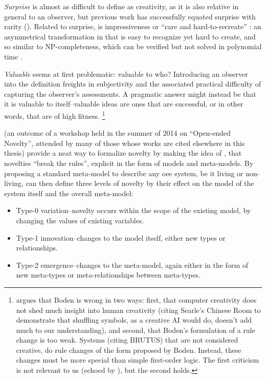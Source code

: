 \begin{mdframed}[style=box, frametitle={Creativity, and its relationship to Novelty, Surprise, and Value}]
\emph{Surprise} is almost as difficult to define as creativity, as it is also relative in general to an observer, but previous work has successfully equated surprise with rarity (\eg \cite{Kowaliw2009}). Related to surprise, is impressiveness or ``rare and hard-to-recreate'' \parencite{Lehman2012}: an asymmetrical transformation in that is easy to recognize yet hard to create, and so similar to NP-completeness, which can be verified but not solved in polynomial time \parencite{Lehman2012}.

\emph{Valuable} seems at first problematic: valuable to who? Introducing an observer into the definition freights in subjectivity and the associated practical difficulty of capturing the observer's assessments. A pragmatic answer might instead be that it is valuable to itself--valuable ideas are ones that are successful, or in other words, that are of high fitness. 
\footnote{\cite{Bringsjord2000} argues that Boden is wrong in two ways: first, that computer creativity does not shed much insight into human creativity (citing Searle's Chinese Room to demonstrate that shuffling symbols, as a creative AI would do, doesn't add much to our understanding), and second, that Boden's formulation of a rule change is too weak. Systems (citing BRUTUS) that are not considered creative, do rule changes of the form proposed by Boden. Instead, these changes must be more special than simple first-order logic. The first criticism is not relevant to us (echoed by \cite{Dorin2009}), but the second holds.}
\end{mdframed}

\Cite{BanzhafBaumgaertnerBeslonEtAl2016} (an outcome of a workshop held in the summer of 2014 on ``Open-ended Novelty'', attended by many of those whose works are cited elsewhere in this thesis) provide a neat way to formalize novelty by making the idea of \cite{Boden2004}, that novelties ``break the rules'', explicit in the form of models and meta-models. By proposing a standard meta-model to describe any \gls{oee} system, be it living or non-living, \cite{BanzhafBaumgaertnerBeslonEtAl2016} can then define three levels of novelty by their effect on the model of the system itself and the overall meta-model:

\begin{itemize}
	\item Type-0 variation--novelty occurs within the scope of the existing model, by changing the values of existing variables.
	\item Type-1 innovation--changes to the model itself, either new types or relationships.
	\item Type-2 emergence--changes to the meta-model, again either in the form of new meta-types or meta-relationships between meta-types.
\end{itemize}
	
